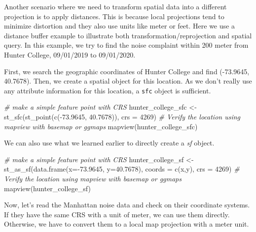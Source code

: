 \documentclass[
  11pt,
]{book}
\newenvironment{Shaded}{\begin{snugshade}}{\end{snugshade}}
\newcommand{\AttributeTok}[1]{\textcolor[rgb]{0.77,0.63,0.00}{#1}}
\newcommand{\CommentTok}[1]{\textcolor[rgb]{0.56,0.35,0.01}{\textit{#1}}}
\newcommand{\DecValTok}[1]{\textcolor[rgb]{0.00,0.00,0.81}{#1}}
\newcommand{\FloatTok}[1]{\textcolor[rgb]{0.00,0.00,0.81}{#1}}
\newcommand{\FunctionTok}[1]{\textcolor[rgb]{0.00,0.00,0.00}{#1}}
\newcommand{\NormalTok}[1]{#1}
\newcommand{\OtherTok}[1]{\textcolor[rgb]{0.56,0.35,0.01}{#1}}
\newcommand{\SpecialCharTok}[1]{\textcolor[rgb]{0.00,0.00,0.00}{#1}}
\newcommand{\StringTok}[1]{\textcolor[rgb]{0.31,0.60,0.02}{#1}}
\begin{document}
Another scenario where we need to transform spatial data into a different projection is to apply distances. This is because local projections tend to minimize distortion and they also use units like meter or feet. Here we use a distance buffer example to illustrate both transformation/reprojection and spatial query. In this example, we try to find the noise complaint within 200 meter from Hunter College, 09/01/2019 to 09/01/2020.

First, we search the geographic coordinates of Hunter College and find (-73.9645, 40.7678). Then, we create a spatial object for this location. As we don't really use any attribute information for this location, a \texttt{sfc} object is sufficient.

\begin{Shaded}
\begin{Highlighting}[]
\CommentTok{\# make a simple feature point with CRS}
\NormalTok{hunter\_college\_sfc }\OtherTok{\textless{}{-}} \FunctionTok{st\_sfc}\NormalTok{(}\FunctionTok{st\_point}\NormalTok{(}\FunctionTok{c}\NormalTok{(}\SpecialCharTok{{-}}\FloatTok{73.9645}\NormalTok{, }\FloatTok{40.7678}\NormalTok{)), }\AttributeTok{crs =} \DecValTok{4269}\NormalTok{)}
\CommentTok{\# Verify the location using mapview with basemap or ggmaps}
\FunctionTok{mapview}\NormalTok{(hunter\_college\_sfc)}
\end{Highlighting}
\end{Shaded}

We can also use what we learned earlier to directly create a \emph{sf} object.

\begin{Shaded}
\begin{Highlighting}[]
\CommentTok{\# make a simple feature point with CRS}
\NormalTok{hunter\_college\_sf }\OtherTok{\textless{}{-}} \FunctionTok{st\_as\_sf}\NormalTok{(}\FunctionTok{data.frame}\NormalTok{(}\AttributeTok{x=}\SpecialCharTok{{-}}\FloatTok{73.9645}\NormalTok{, }\AttributeTok{y=}\FloatTok{40.7678}\NormalTok{), }\AttributeTok{coords =} \FunctionTok{c}\NormalTok{(}\StringTok{\textquotesingle{}x\textquotesingle{}}\NormalTok{,}\StringTok{\textquotesingle{}y\textquotesingle{}}\NormalTok{), }\AttributeTok{crs =} \DecValTok{4269}\NormalTok{)}
\CommentTok{\# Verify the location using mapview with basemap or ggmaps}
\FunctionTok{mapview}\NormalTok{(hunter\_college\_sf)}
\end{Highlighting}
\end{Shaded}

Now, let's read the Manhattan noise data and check on their coordinate systems. If they have the same CRS with a unit of meter, we can use them directly. Otherwise, we have to convert them to a local map projection with a meter unit.
\end{document}
